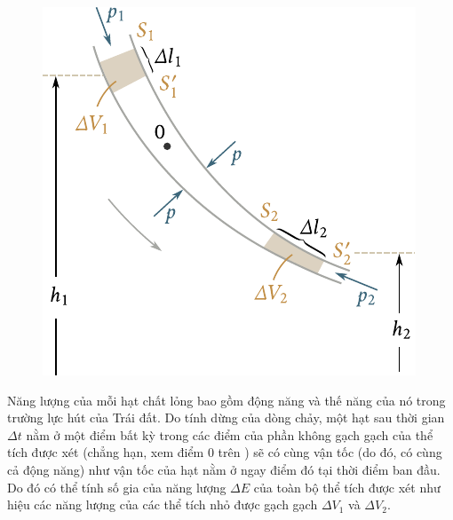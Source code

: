 \begin{figure}[!htb]
	\begin{center}
		\includegraphics[scale=1.0]{figures/ch_09/fig_9_5.pdf}
		\caption[]{}
		\label{fig:9_5}
	\end{center}
	\vspace{-0.8cm}
\end{figure}


Năng lượng của mỗi hạt chất lỏng bao gồm động năng và thế năng của nó trong trường lực hút của Trái đất. Do tính dừng của dòng chảy, một hạt sau thời gian $\Delta t$ nằm ở một điểm bất kỳ trong các điểm của phần không gạch gạch của thể tích được xét (chẳng hạn, xem điểm  $0$ trên ) sẽ có cùng vận tốc (do đó, có cùng cả động năng) như vận tốc của hạt nằm ở ngay điểm đó tại thời điểm ban đầu. Do đó có thể tính số gia của năng lượng $\Delta E$ của toàn bộ thể tích được xét như hiệu các năng lượng của các thể tích nhỏ được gạch gạch $\Delta V_1$ và $\Delta V_2$.

